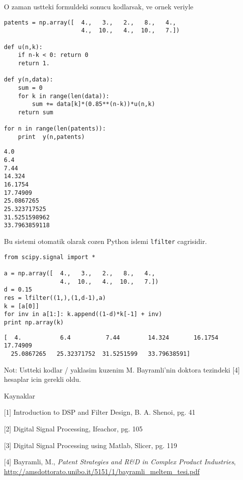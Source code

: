 \documentclass[12pt,fleqn]{article}\usepackage{../common}
\begin{document}
O zaman ustteki formuldeki sonucu kodlarsak, ve ornek veriyle

\begin{verbatim}
patents = np.array([  4.,   3.,   2.,   8.,   4.,  
                      4.,  10.,   4.,  10.,   7.])

def u(n,k):
    if n-k < 0: return 0
    return 1.

def y(n,data):
    sum = 0
    for k in range(len(data)):
        sum += data[k]*(0.85**(n-k))*u(n,k)
    return sum

for n in range(len(patents)):    
    print  y(n,patents)
\end{verbatim}

\begin{verbatim}
4.0
6.4
7.44
14.324
16.1754
17.74909
25.0867265
25.323717525
31.5251598962
33.7963859118
\end{verbatim}

Bu sistemi otomatik olarak cozen Python islemi \verb!lfilter!
cagrisidir.

\begin{verbatim}
from scipy.signal import *

a = np.array([  4.,   3.,   2.,   8.,   4.,  
                4.,  10.,   4.,  10.,   7.])
d = 0.15 
res = lfilter((1,),(1,d-1),a) 
k = [a[0]] 
for inv in a[1:]: k.append((1-d)*k[-1] + inv) 
print np.array(k) 
\end{verbatim}

\begin{verbatim}
[  4.           6.4          7.44        14.324       16.1754      17.74909
  25.0867265   25.32371752  31.5251599   33.79638591]
\end{verbatim}

Not: Ustteki kodlar / yaklasim kuzenim M. Bayramli'nin doktora tezindeki
[4] hesaplar icin gerekli oldu.

Kaynaklar

[1] Introduction to DSP and Filter Design, B. A. Shenoi, pg. 41

[2] Digital Signal Processing, Ifeachor, pg. 105

[3] Digital Signal Processing using Matlab, Slicer, pg. 119

[4] Bayramli, M., {\em Patent Strategies and R\&D in Complex Product
  Industries}, \url{http://amsdottorato.unibo.it/5151/1/bayramli_meltem_tesi.pdf}
\end{document}
